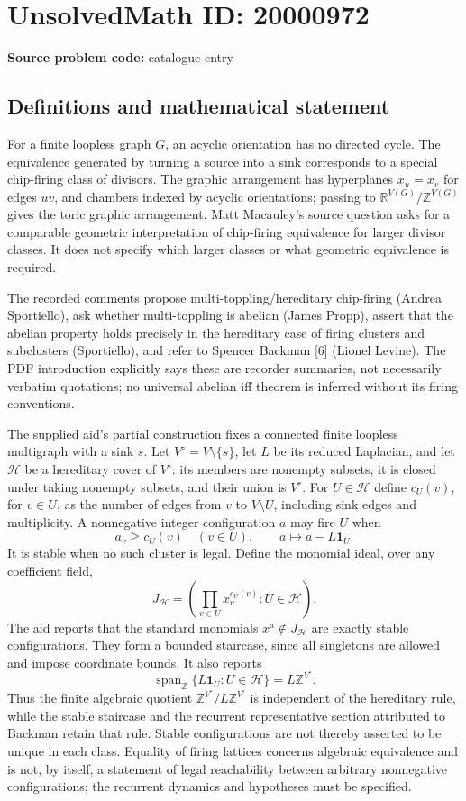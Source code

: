 \documentclass[11pt]{article}
\newcommand{\Z}{\mathbb{Z}}
\newcommand{\R}{\mathbb{R}}
\begin{document}
\section*{UnsolvedMath ID: 20000972}
\textbf{Source problem code:} catalogue entry
\subsection{Definitions and mathematical statement}
For a finite loopless graph \(G\), an acyclic orientation has no directed cycle. The equivalence generated by turning a source into a sink corresponds to a special chip-firing class of divisors. The graphic arrangement has hyperplanes \(x_u=x_v\) for edges \(uv\), and chambers indexed by acyclic orientations; passing to \(\R^{V(G)}/\Z^{V(G)}\) gives the toric graphic arrangement. Matt Macauley's source question asks for a comparable geometric interpretation of chip-firing equivalence for larger divisor classes. It does not specify which larger classes or what geometric equivalence is required.

The recorded comments propose multi-toppling/hereditary chip-firing (Andrea Sportiello), ask whether multi-toppling is abelian (James Propp), assert that the abelian property holds precisely in the hereditary case of firing clusters and subclusters (Sportiello), and refer to Spencer Backman [6] (Lionel Levine). The PDF introduction explicitly says these are recorder summaries, not necessarily verbatim quotations; no universal abelian iff theorem is inferred without its firing conventions.

The supplied aid's partial construction fixes a connected finite loopless multigraph with a sink \(s\). Let \(V^\circ=V\setminus\{s\}\), let \(L\) be its reduced Laplacian, and let \(\mathcal H\) be a hereditary cover of \(V^\circ\): its members are nonempty subsets, it is closed under taking nonempty subsets, and their union is \(V^\circ\). For \(U\in\mathcal H\) define \(c_U(v)\), for \(v\in U\), as the number of edges from \(v\) to \(V\setminus U\), including sink edges and multiplicity. A nonnegative integer configuration \(a\) may fire \(U\) when
\[
 a_v\ge c_U(v)\quad(v\in U),
 \qquad a\longmapsto a-L\mathbf1_U.
\]
It is stable when no such cluster is legal. Define the monomial ideal, over any coefficient field,
\[
 J_{\mathcal H}=\left(\prod_{v\in U}x_v^{c_U(v)}:U\in\mathcal H\right).
\]
The aid reports that the standard monomials \(x^a\notin J_{\mathcal H}\) are exactly stable configurations. They form a bounded staircase, since all singletons are allowed and impose coordinate bounds. It also reports
\[
 \operatorname{span}_{\Z}\{L\mathbf1_U:U\in\mathcal H\}
 =L\Z^{V^\circ}.
\]
Thus the finite algebraic quotient \(\Z^{V^\circ}/L\Z^{V^\circ}\) is independent of the hereditary rule, while the stable staircase and the recurrent representative section attributed to Backman retain that rule. Stable configurations are not thereby asserted to be unique in each class. Equality of firing lattices concerns algebraic equivalence and is not, by itself, a statement of legal reachability between arbitrary nonnegative configurations; the recurrent dynamics and hypotheses must be specified.
\end{document}

